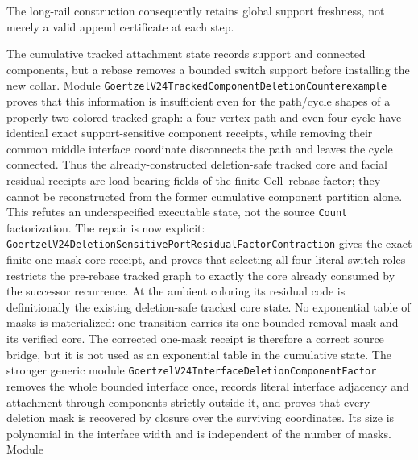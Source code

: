 \documentclass[11pt]{article}
\theoremstyle{definition}
\begin{document}
\begin{description}
        The long-rail construction consequently retains global support
        freshness, not merely a valid append certificate at each step.
  \item[Reusing a component receipt after a boundary switch.] The cumulative
        tracked attachment state records support and connected components, but
        a rebase removes a bounded switch support before installing the new
        collar.  Module
        \texttt{GoertzelV24TrackedComponentDeletionCounterexample} proves that
        this information is insufficient even for the path/cycle shapes of a
        properly two-colored tracked graph: a four-vertex path and even
        four-cycle have identical exact support-sensitive component receipts, while
        removing their common middle interface coordinate disconnects the
        path and leaves the cycle connected.  Thus the already-constructed
        deletion-safe tracked core and facial residual receipts are
        load-bearing fields of the finite Cell--rebase factor; they cannot be
        reconstructed from the former cumulative component partition alone.
        This refutes an underspecified executable state, not the source
        \texttt{Count} factorization.  The repair is now explicit:
        \texttt{GoertzelV24DeletionSensitivePortResidualFactorContraction}
        gives the exact finite one-mask core receipt, and
        proves that selecting all four literal switch roles restricts the
        pre-rebase tracked graph to exactly the core already consumed by the
        successor recurrence.  At the ambient coloring its residual code is
        definitionally the existing deletion-safe tracked core state.  No
        exponential table of masks is materialized: one transition carries
        its one bounded removal mask and its verified core.  The corrected
        one-mask receipt is therefore a correct source bridge, but it is not
        used as an exponential table in the cumulative state.  The stronger
        generic module
        \texttt{GoertzelV24InterfaceDeletionComponentFactor} removes the whole
        bounded interface once, records literal interface adjacency and
        attachment through components strictly outside it, and proves that
        every deletion mask is recovered by closure over the surviving
        coordinates.  Its size is polynomial in the interface width and is
        independent of the number of masks.  Module

\end{description}
\end{document}
